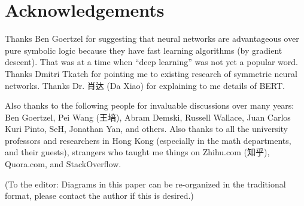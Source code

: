 \documentclass[orivec]{llncs}
\begin{document}
\section*{Acknowledgements}

Thanks Ben Goertzel for suggesting that neural networks are advantageous over pure symbolic logic because they have fast learning algorithms (by gradient descent).  That was at a time when ``deep learning'' was not yet a popular word.  Thanks Dmitri Tkatch for pointing me to existing research of symmetric neural networks.  Thanks Dr. 肖达 (Da Xiao) for explaining to me details of BERT. 

Also thanks to the following people for invaluable discussions over many years:  Ben Goertzel, Pei Wang (王培), Abram Demski, Russell Wallace, Juan Carlos Kuri Pinto, SeH, Jonathan Yan, and others.  Also thanks to all the university professors and researchers in Hong Kong (especially in the math departments, and their guests), strangers who taught me things on Zhihu.com (知乎), Quora.com, and StackOverflow.

\printbibliography

{\color{red}(To the editor:  Diagrams in this paper can be re-organized in the traditional format, please contact the author if this is desired.)}
\end{document}
